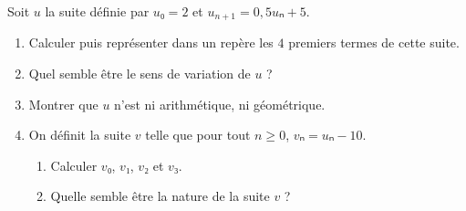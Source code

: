 \documentclass[
	classe=$1^{ere}STI2D$
]{évaluation}
\begin{document}
\begin{exercice}[7]
	Soit $u$ la suite définie par $u₀ = 2$ et $u_{n+1} = 0,5uₙ + 5$.

	\begin{enumerate}
		\item Calculer puis représenter dans un repère les $4$ premiers termes de cette suite.

		\item Quel semble être le sens de variation de $u$ ?

		\item Montrer que $u$ n'est ni arithmétique, ni géométrique.
		\item On définit la suite $v$ telle que pour tout $n ≥ 0$, $vₙ = uₙ - 10$.
		      \begin{enumerate}
			      \item Calculer $v₀$, $v₁$, $v₂$ et $v₃$.

			      \item Quelle semble être la nature de la suite $v$ ?


\end{enumerate}
\end{enumerate}
\end{exercice}
\end{document}

